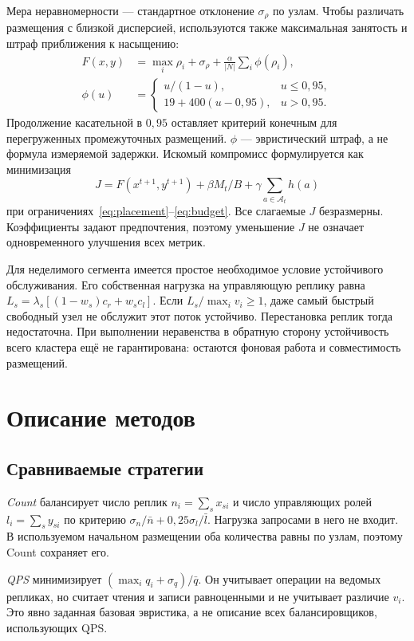 \documentclass{misisarticle}
\begin{document}
Мера неравномерности --- стандартное отклонение $\sigma_\rho$ по узлам. Чтобы различать размещения с близкой дисперсией, используются также максимальная занятость и штраф приближения к насыщению:
\begin{align}
F(x,y)&=\max_i\rho_i+\sigma_\rho+\frac{\alpha}{|N|}\sum_i\phi(\rho_i),\label{eq:fitness}\\
\phi(u)&=\begin{cases}u/(1-u),&u\le0{,}95,\\19+400(u-0{,}95),&u>0{,}95.\end{cases}\label{eq:penalty}
\end{align}
Продолжение касательной в $0{,}95$ оставляет критерий конечным для перегруженных промежуточных размещений. $\phi$ --- эвристический штраф, а не формула измеряемой задержки. Искомый компромисс формулируется как минимизация
\begin{equation}
J=F(x^{t+1},y^{t+1})+\beta M_t/B+\gamma\sum_{a\in\mathcal A_t}h(a)
\label{eq:objective}
\end{equation}
при ограничениях~\eqref{eq:placement}--\eqref{eq:budget}. Все слагаемые $J$ безразмерны. Коэффициенты задают предпочтения, поэтому уменьшение $J$ не означает одновременного улучшения всех метрик.

Для неделимого сегмента имеется простое необходимое условие устойчивого обслуживания. Его собственная нагрузка на управляющую реплику равна $L_s=\lambda_s[(1-w_s)c_r+w_sc_l]$. Если $L_s/\max_i v_i\ge1$, даже самый быстрый свободный узел не обслужит этот поток устойчиво. Перестановка реплик тогда недостаточна. При выполнении неравенства в обратную сторону устойчивость всего кластера ещё не гарантирована: остаются фоновая работа и совместимость размещений.

\section{Описание методов}
\subsection{Сравниваемые стратегии}
\textit{Count} балансирует число реплик $n_i=\sum_sx_{si}$ и число управляющих ролей $l_i=\sum_sy_{si}$ по критерию $\sigma_n/\bar n+0{,}25\sigma_l/\bar l$. Нагрузка запросами в него не входит. В используемом начальном размещении оба количества равны по узлам, поэтому Count сохраняет его.

\textit{QPS} минимизирует $(\max_iq_i+\sigma_q)/\bar q$. Он учитывает операции на ведомых репликах, но считает чтения и записи равноценными и не учитывает различие $v_i$. Это явно заданная базовая эвристика, а не описание всех балансировщиков, использующих QPS.
\end{document}
